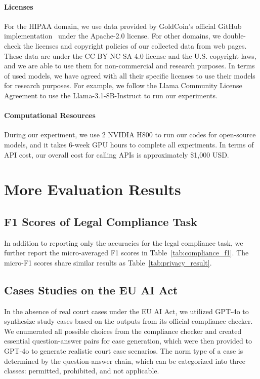\paragraph{Licenses}
For the HIPAA domain, we use data provided by GoldCoin's official GitHub implementation~\cite{fan2024goldcoin} under the Apache-2.0 license.
For other domains, we double-check the licenses and copyright policies of our collected data from web pages. 
These data are under the CC BY-NC-SA 4.0 license and the U.S. copyright laws, and we are able to use them for non-commercial and research purposes.
In terms of used models, we have agreed with all their specific licenses to use their models for research purposes.
For example, we follow the Llama Community License Agreement to use the Llama-3.1-8B-Instruct to run our experiments.



\paragraph{Computational Resources} During our experiment, we use 2 NVIDIA H800 to run our codes for open-source models, and it takes 6-week GPU hours to complete all experiments.
In terms of API cost, our overall cost for calling APIs is approximately \$1,000 USD.





\section{More Evaluation Results}


\subsection{F1 Scores of Legal Compliance Task}

In addition to reporting only the accuracies for the legal compliance task, we further report the micro-averaged F1 scores in Table~\ref{tab:compliance_f1}.
The micro-F1 scores share similar results as Table~\ref{tab:privacy_result}.





\subsection{Cases Studies on the EU AI Act}
\label{app: case}
In the absence of real court cases under the EU AI Act, we utilized GPT-4o to synthesize study cases based on the outputs from its official compliance checker. 
We enumerated all possible choices from the compliance checker and created essential question-answer pairs for case generation, which were then provided to GPT-4o to generate realistic court case scenarios. 
The norm type of a case is determined by the question-answer chain, which can be categorized into three classes: permitted, prohibited, and not applicable.

